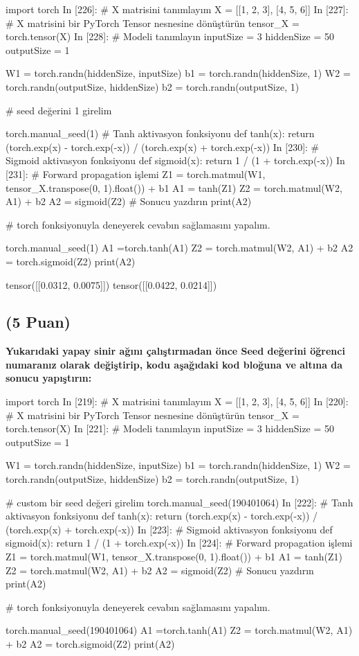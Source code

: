 \documentclass[11pt]{article}
\begin{document}
\begin{python}
import torch
In [226]:
# X matrisini tanımlayım
X = [[1, 2, 3], [4, 5, 6]]
In [227]:
# X matrisini bir PyTorch Tensor nesnesine dönüştürün
tensor_X = torch.tensor(X)
In [228]:
# Modeli tanımlayın
inputSize = 3
hiddenSize = 50
outputSize = 1

W1 = torch.randn(hiddenSize, inputSize)
b1 = torch.randn(hiddenSize, 1)
W2 = torch.randn(outputSize, hiddenSize)
b2 = torch.randn(outputSize, 1)

#  seed değerini 1 girelim 

torch.manual_seed(1)
# Tanh aktivasyon fonksiyonu
def tanh(x):
     return (torch.exp(x) - torch.exp(-x)) / (torch.exp(x) + torch.exp(-x))
In [230]:
# Sigmoid aktivasyon fonksiyonu
def sigmoid(x):
    return 1 / (1 + torch.exp(-x))
In [231]:
# Forward propagation işlemi
Z1 = torch.matmul(W1, tensor_X.transpose(0, 1).float()) + b1
A1 = tanh(Z1)
Z2 = torch.matmul(W2, A1) + b2
A2 = sigmoid(Z2)
# Sonucu yazdırın
print(A2)

# torch fonksiyonuyla deneyerek cevabın sağlamasını yapalım.

torch.manual_seed(1)
A1 =torch.tanh(A1)
Z2 = torch.matmul(W2, A1) + b2
A2 = torch.sigmoid(Z2)
print(A2)
\end{python}

tensor([[0.0312, 0.0075]])
tensor([[0.0422, 0.0214]])
\clearpage %
\subsection{(5 Puan)} \textbf{Yukarıdaki yapay sinir ağını çalıştırmadan önce Seed değerini öğrenci numaranız olarak değiştirip, kodu aşağıdaki kod bloğuna ve altına da sonucu yapıştırın:}

\begin{python}
import torch
In [219]:
# X matrisini tanımlayım
X = [[1, 2, 3], [4, 5, 6]]
In [220]:
# X matrisini bir PyTorch Tensor nesnesine dönüştürün
tensor_X = torch.tensor(X)
In [221]:
# Modeli tanımlayın
inputSize = 3
hiddenSize = 50
outputSize = 1

W1 = torch.randn(hiddenSize, inputSize)
b1 = torch.randn(hiddenSize, 1)
W2 = torch.randn(outputSize, hiddenSize)
b2 = torch.randn(outputSize, 1)

# custom bir seed değeri girelim 
torch.manual_seed(190401064)
In [222]:
# Tanh aktivasyon fonksiyonu
def tanh(x):
     return (torch.exp(x) - torch.exp(-x)) / (torch.exp(x) + torch.exp(-x))
In [223]:
# Sigmoid aktivasyon fonksiyonu
def sigmoid(x):
    return 1 / (1 + torch.exp(-x))
In [224]:
# Forward propagation işlemi
Z1 = torch.matmul(W1, tensor_X.transpose(0, 1).float()) + b1
A1 = tanh(Z1)
Z2 = torch.matmul(W2, A1) + b2
A2 = sigmoid(Z2)
# Sonucu yazdırın
print(A2)

# torch fonksiyonuyla deneyerek cevabın sağlamasını yapalım.

torch.manual_seed(190401064)
A1 =torch.tanh(A1)
Z2 = torch.matmul(W2, A1) + b2
A2 = torch.sigmoid(Z2)
print(A2)
\end{python}
\end{document}
